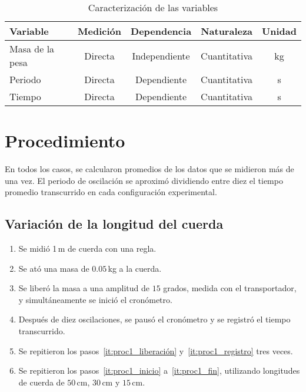 \documentclass[letterpaper]{report}
\numberwithin{table}{section}
\begin{document}
\begin{table}[h!]
  \centering
  \begin{tabular}{lcccc}
    \toprule
    \textbf{Variable} & \textbf{Medición} & \textbf{Dependencia}
    & \textbf{Naturaleza} & \textbf{Unidad} \\
    \midrule
    Masa de la pesa & Directa & Independiente & Cuantitativa & kg \\
    Periodo & Directa & Dependiente & Cuantitativa & s \\
    Tiempo & Directa & Dependiente & Cuantitativa & s \\
    \bottomrule
  \end{tabular}
  \caption{Caracterización de las variables}\label{tab:masa_variables}
\end{table}

\section{Procedimiento}

En todos los casos, se calcularon promedios de los datos que se
midieron más de una vez. El periodo de oscilación se aproximó
dividiendo entre diez el tiempo promedio transcurrido en cada configuración
experimental.

\subsection{Variación de la longitud del cuerda}

\begin{enumerate}
  \item Se midió 1\,m de cuerda con una regla.\label{it:proc1_inicio}
  \item Se ató una masa de $0.05$\,kg a la cuerda.
  \item Se liberó la masa a una amplitud de $15$ grados, medida con
    el transportador, y simultáneamente se inició el
    cronómetro.\label{it:proc1_liberación}
  \item Después de diez oscilaciones, se pausó el cronómetro y se
    registró el tiempo transcurrido.\label{it:proc1_registro}
  \item Se repitieron los pasos~\ref{it:proc1_liberación}
    y~\ref{it:proc1_registro} tres veces.\label{it:proc1_fin}
  \item Se repitieron los pasos~\ref{it:proc1_inicio}
    a~\ref{it:proc1_fin}, utilizando longitudes de cuerda de
    $50$\,cm, $30$\,cm y $15$\,cm.
\end{enumerate}
\end{document}
